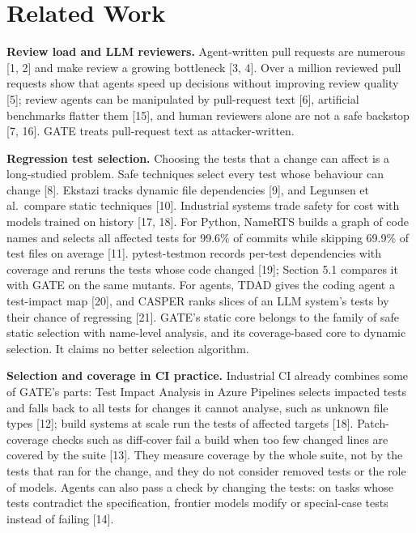 \documentclass[conference]{IEEEtran}
\begin{document}
\section{Related Work}\label{related-work}

\textbf{Review load and LLM reviewers.} Agent-written pull requests are numerous {[}1, 2{]} and make review a growing bottleneck {[}3, 4{]}. Over a million reviewed pull requests show that agents speed up decisions without improving review quality {[}5{]}; review agents can be manipulated by pull-request text {[}6{]}, artificial benchmarks flatter them {[}15{]}, and human reviewers alone are not a safe backstop {[}7, 16{]}. GATE treats pull-request text as attacker-written.

\textbf{Regression test selection.} Choosing the tests that a change can affect is a long-studied problem. Safe techniques select every test whose behaviour can change {[}8{]}. Ekstazi tracks dynamic file dependencies {[}9{]}, and Legunsen et al.~compare static techniques {[}10{]}. Industrial systems trade safety for cost with models trained on history {[}17, 18{]}. For Python, NameRTS builds a graph of code names and selects all affected tests for 99.6\% of commits while skipping 69.9\% of test files on average {[}11{]}. pytest-testmon records per-test dependencies with coverage and reruns the tests whose code changed {[}19{]}; Section 5.1 compares it with GATE on the same mutants. For agents, TDAD gives the coding agent a test-impact map {[}20{]}, and CASPER ranks slices of an LLM system's tests by their chance of regressing {[}21{]}. GATE's static core belongs to the family of safe static selection with name-level analysis, and its coverage-based core to dynamic selection. It claims no better selection algorithm.

\textbf{Selection and coverage in CI practice.} Industrial CI already combines some of GATE's parts: Test Impact Analysis in Azure Pipelines selects impacted tests and falls back to all tests for changes it cannot analyse, such as unknown file types {[}12{]}; build systems at scale run the tests of affected targets {[}18{]}. Patch-coverage checks such as diff-cover fail a build when too few changed lines are covered by the suite {[}13{]}. They measure coverage by the whole suite, not by the tests that ran for the change, and they do not consider removed tests or the role of models. Agents can also pass a check by changing the tests: on tasks whose tests contradict the specification, frontier models modify or special-case tests instead of failing {[}14{]}.
\end{document}
